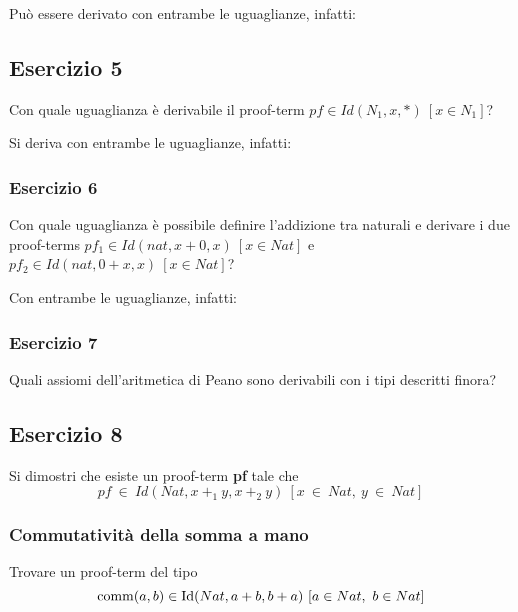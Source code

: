 Può essere derivato con entrambe le uguaglianze, infatti:



\subsection{Esercizio 5}
\begin{thm}
	Con quale uguaglianza è derivabile il proof-term $pf\in Id(N_1, x, \ast)~[x\in N_1]$?
\end{thm}
Si deriva con entrambe le uguaglianze, infatti:


\subsubsection{Esercizio 6}
\begin{thm}
	Con quale uguaglianza è possibile definire l'addizione tra naturali e derivare i due proof-terms $pf_1\in Id(nat, x+0,x)~[x\in Nat]$ e $pf_2\in Id(nat, 0+x,x)~[x\in Nat]$?
\end{thm}
Con entrambe le uguaglianze, infatti:


\subsubsection{Esercizio 7}
\begin{thm}
	Quali assiomi dell'aritmetica di Peano sono derivabili con i tipi descritti finora?
\end{thm}


\subsection{Esercizio 8}
\begin{thm}
	Si dimostri che esiste un proof-term \textbf{pf} tale che
	\[pf~\in~Id(Nat, x~+_1~y, x~+_2~y)~[x~\in~Nat,~y~\in~Nat]\]
\end{thm}
\subsubsection{Commutatività della somma a mano}
Trovare un proof-term del tipo
\[ \mathrm{comm}(a, b) \in \mathrm{Id}(Nat, a+b, b+a)\ [a\in Nat,\ b\in Nat] \]


